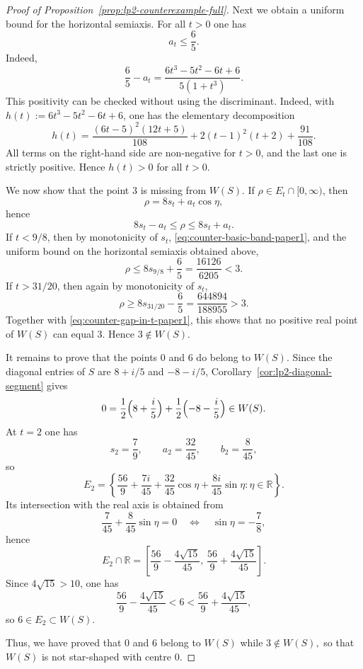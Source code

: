 \documentclass[11pt]{amsart}
\numberwithin{equation}{section}
\theoremstyle{definition}
\theoremstyle{remark}
\newcommand{\R}{\mathbb{R}}
\begin{document}
\begin{proof}[Proof of Proposition~\ref{prop:lp2-counterexample-full}]
Next we obtain a uniform bound for the horizontal semiaxis.
For all $t>0$ one has
\[
a_t\le \frac65.
\]
Indeed,
\[
\frac65-a_t=
\frac{6t^3-5t^2-6t+6}{5(1+t^3)}.
\]
This positivity can be checked without using the discriminant. Indeed, with
$h(t):=6t^3-5t^2-6t+6$, one has the elementary decomposition
\[
        h(t)=\frac{(6t-5)^2(12t+5)}{108}
             +2(t-1)^2(t+2)+\frac{91}{108}.
\]
All terms on the right-hand side are non-negative for $t>0$, and the last one
is strictly positive. Hence $h(t)>0$ for all $t>0$.

We now show that the point \(3\) is missing from \(W(S)\).
If $\rho\in E_t\cap[0,\infty)$, then
\[
\rho=8s_t+a_t\cos\eta,
\]
hence
\begin{equation}\label{eq:counter-basic-band-paper1}
8s_t-a_t\le \rho\le 8s_t+a_t.
\end{equation}
If $t<9/8$, then by monotonicity of $s_t$, \eqref{eq:counter-basic-band-paper1}, and the uniform bound on the horizontal semiaxis obtained above,
\[
\rho\le 8s_{9/8}+\frac65=\frac{16126}{6205}<3.
\]
If $t>31/20$, then again by monotonicity of $s_t$,
\[
\rho\ge 8s_{31/20}-\frac65=\frac{644894}{188955}>3.
\]
Together with \eqref{eq:counter-gap-in-t-paper1}, this shows that no positive real point of $W(S)$ can equal $3$. Hence $3\notin W(S)$.

It remains to prove that the points $0$ and $6$ do belong to $W(S)$.
Since the diagonal entries of $S$ are $8+i/5$ and $-8-i/5$, Corollary~\ref{cor:lp2-diagonal-segment} gives
\[
0=\frac12\Bigl(8+\frac{i}{5}\Bigr)+\frac12\Bigl(-8-\frac{i}{5}\Bigr)\in W(S).
\]
At $t=2$ one has
\[
s_2=\frac79,
\qquad
a_2=\frac{32}{45},
\qquad
b_2=\frac{8}{45},
\]
so
\[
E_2=
\left\{
\frac{56}{9}+\frac{7i}{45}+\frac{32}{45}\cos\eta+\frac{8i}{45}\sin\eta:
\eta\in\R
\right\}.
\]
Its intersection with the real axis is obtained from
\[
\frac{7}{45}+\frac{8}{45}\sin\eta=0
\quad\Longleftrightarrow\quad
\sin\eta=-\frac78,
\]
hence
\[
E_2\cap\R=
\left[
\frac{56}{9}-\frac{4\sqrt{15}}{45},
\,\frac{56}{9}+\frac{4\sqrt{15}}{45}
\right].
\]
Since $4\sqrt{15}>10$, one has
\[
\frac{56}{9}-\frac{4\sqrt{15}}{45}<6<\frac{56}{9}+\frac{4\sqrt{15}}{45},
\]
so $6\in E_2\subset W(S)$.

Thus, we have proved that $0$ and $6$ belong to $W(S)$ while $3\notin W(S),$ so that $W(S)$ is not star-shaped with centre $0$.
\end{proof}
\end{document}
